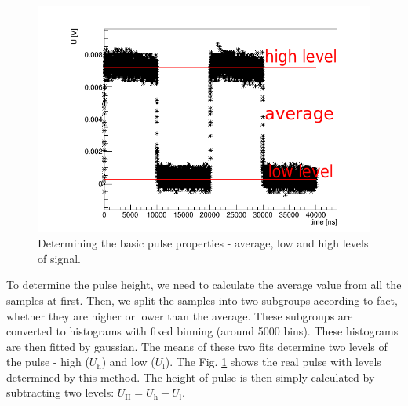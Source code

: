  \begin{figure}[H]
 \centering
 \includegraphics[scale=0.65]{./pictures/PMTPulse}
 \caption{Determining the basic pulse properties - average, low and high levels of signal.}
 \label{pulse}
\end{figure}

To determine the pulse height, we need to calculate the average value from all the samples at first. Then, we split the samples into two subgroups according to fact, whether they are higher or lower than the average. These subgroups are converted to histograms with fixed binning (around 5000 bins). These histograms are then fitted by gaussian. The means of these two fits determine two levels of the pulse - high ($U_\textrm{h}$) and low ($U_\textrm{l}$). The Fig. \ref{pulse} shows the real pulse with levels determined by this method. The height of pulse is then simply calculated by subtracting two levels: $U_\textrm{H} = U_\textrm{h} - U_\textrm{l}$.

